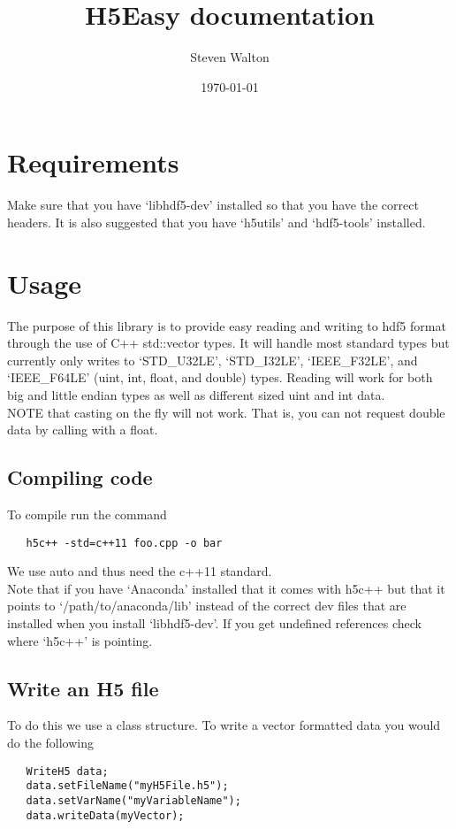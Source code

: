 \documentclass[11pt]{article}
\title{H5Easy documentation}
\date{\today}
\author{Steven Walton}
\begin{document}
\maketitle
\tableofcontents
\section{Requirements}
Make sure that you have `libhdf5-dev' installed so that you have the correct headers. 
It is also suggested that you have `h5utils' and `hdf5-tools' installed.
\section{Usage}
The purpose of this library is to provide easy reading and writing to hdf5 format through
the use of C++ std::vector types. It will handle most standard types but currently only
writes to `STD\_U32LE', `STD\_I32LE', `IEEE\_F32LE', and `IEEE\_F64LE' (uint, int, float, 
and double) types. Reading will work for both big and little endian types as well
as different sized uint and int data. 
\\
NOTE that casting on the fly will not work. That is, you can not request double data 
by calling with a float.
\subsection{Compiling code}
To compile run the command
\begin{lstlisting}
   h5c++ -std=c++11 foo.cpp -o bar
\end{lstlisting}
We use auto and thus need the c++11 standard. \\
Note that if you have `Anaconda' installed that it comes with h5c++ but that it points 
to `/path/to/anaconda/lib' instead of the correct dev files that are installed when you
install `libhdf5-dev'. If you get undefined references check where `h5c++' is pointing.

\subsection{Write an H5 file}
To do this we use a class structure. To write a vector formatted data you would do
the following
\begin{lstlisting}
   WriteH5 data;
   data.setFileName("myH5File.h5");
   data.setVarName("myVariableName");
   data.writeData(myVector);
\end{lstlisting}
\end{document}
